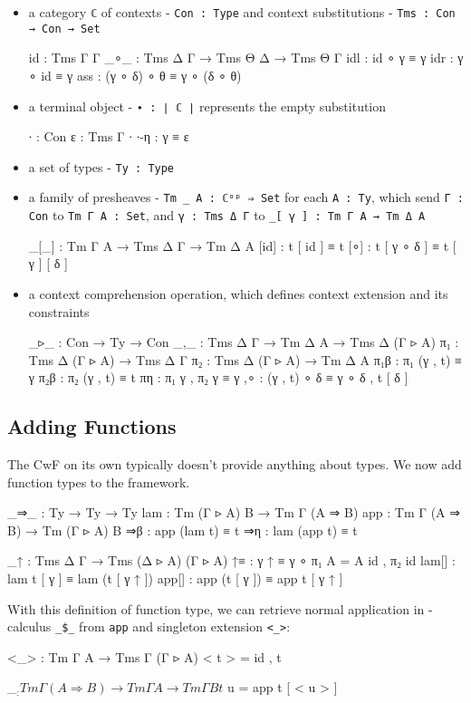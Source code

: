 \begin{itemize}
  \item{a category \texttt{ℂ} of contexts - \texttt{Con : Type} and context substitutions - \texttt{Tms : Con → Con → Set}}
  \begin{code}
    id   : Tms Γ Γ
    _∘_  : Tms Δ Γ → Tms Θ Δ → Tms Θ Γ
    idl  : id ∘ γ ≡ γ
    idr  : γ ∘ id ≡ γ
    ass  : (γ ∘ δ) ∘ θ ≡ γ ∘ (δ ∘ θ)
  \end{code}
  \item{a terminal object - \texttt{∙ : ∣ ℂ ∣} represents the empty substitution}
  \begin{code}
    ∙    : Con
    ε    : Tms Γ ∙
    ∙-η  : γ ≡ ε
  \end{code}
  \item{a set of types - \texttt{Ty : Type}}
  \item{a family of presheaves - \texttt{Tm \_ A : ℂᵒᵖ ⇒ Set} for each \texttt{A : Ty}, which send \texttt{Γ : Con} to \texttt{Tm Γ A : Set}, and \texttt{γ : Tms Δ Γ} to \texttt{\_[ γ ] : Tm Γ A → Tm Δ A}}
  \begin{code}
    _[_] : Tm Γ A → Tms Δ Γ → Tm Δ A
    [id] : t [ id ] ≡ t
    [∘] : t [ γ ∘ δ ] ≡ t [ γ ] [ δ ]
  \end{code}
  \item{a context comprehension operation, which defines context extension and its constraints}
  \begin{code}
    _▹_  : Con → Ty → Con
    _,_  : Tms Δ Γ → Tm Δ A → Tms Δ (Γ ▹ A)
    π₁   : Tms Δ (Γ ▹ A) → Tms Δ Γ
    π₂   : Tms Δ (Γ ▹ A) → Tm Δ A
    π₁β  : π₁ (γ , t) ≡ γ
    π₂β  : π₂ (γ , t) ≡ t
    πη   : π₁ γ , π₂ γ ≡ γ
    ,∘   : (γ , t) ∘ δ ≡ γ ∘ δ , t [ δ ]
  \end{code}
\end{itemize}

\subsection{Adding Functions}

The CwF on its own typically doesn't provide anything about types. We now add function types to the framework.

\begin{code}
    _⇒_  : Ty → Ty → Ty
    lam    : Tm (Γ ▹ A) B → Tm Γ (A ⇒ B)
    app   : Tm Γ (A ⇒ B) → Tm (Γ ▹ A) B
    ⇒β  : app (lam t) ≡ t  
    ⇒η  : lam (app t) ≡ t

    _↑ : Tms Δ Γ → Tms (Δ ▹ A) (Γ ▹ A)
    ↑≡  : γ ↑ ≡ γ ∘ π₁ {A = A} id , π₂ id
    lam[] : lam t [ γ ] ≡ lam (t [ γ ↑ ])
    app[] : app (t [ γ ]) ≡ app t [ γ ↑ ]
\end{code}

With this definition of function type, we can retrieve normal application in \lambda-calculus \texttt{\_\$\_} from \texttt{app} and singleton extension \texttt{<\_>}:

\begin{code}
<_> : Tm Γ A → Tms Γ (Γ ▹ A)
< t > = id , t

_$_ : Tm Γ (A ⇒ B) → Tm Γ A → Tm Γ B
t $ u = app t [ < u > ]
\end{code}
